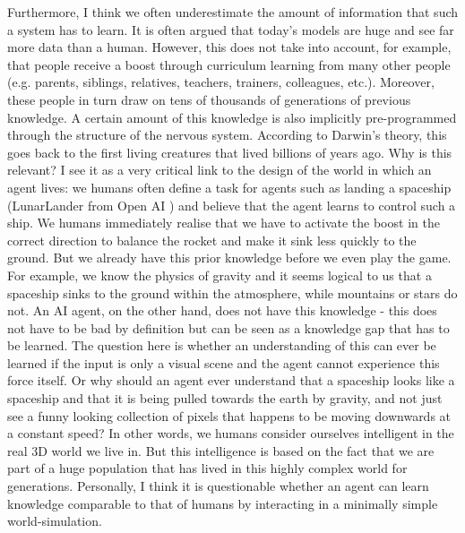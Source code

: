Furthermore, I think we often underestimate the amount of information that such a system has to learn. It is often argued that today's models are huge and see far more data than a human. However, this does not take into account, for example, that people receive a boost through curriculum learning from many other people (e.g. parents, siblings, relatives, teachers, trainers, colleagues, etc.). Moreover, these people in turn draw on tens of thousands of generations of previous knowledge. A certain amount of this knowledge is also implicitly pre-programmed through the structure of the nervous system. According to Darwin's theory, this goes back to the first living creatures that lived billions of years ago. Why is this relevant? I see it as a very critical link to the design of the world in which an agent lives: we humans often define a task for agents such as landing a spaceship (LunarLander from Open AI ) and believe that the agent learns to control such a ship. We humans immediately realise that we have to activate the boost in the correct direction to balance the rocket and make it sink less quickly to the ground. But we already have this prior knowledge before we even play the game. For example, we know the physics of gravity and it seems logical to us that a spaceship sinks to the ground within the atmosphere, while mountains or stars do not. An AI agent, on the other hand, does not have this knowledge - this does not have to be bad by definition but can be seen as a knowledge gap that has to be learned. The question here is whether an understanding of this can ever be learned if the input is only a visual scene and the agent cannot experience this force itself. Or why should an agent ever understand that a spaceship looks like a spaceship and that it is being pulled towards the earth by gravity, and not just see a funny looking collection of pixels that happens to be moving downwards at a constant speed?
In other words, we humans consider ourselves intelligent in the real 3D world we live in. But this intelligence is based on the fact that we are part of a huge population that has lived in this highly complex world for generations. Personally, I think it is questionable whether an agent can learn knowledge comparable to that of humans by interacting in a minimally simple world-simulation.

